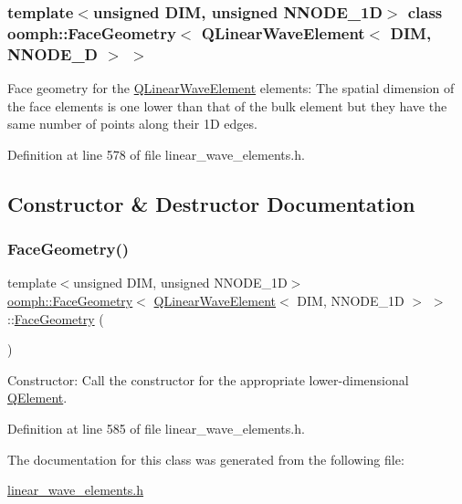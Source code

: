 \subsubsection*{template$<$unsigned D\+IM, unsigned N\+N\+O\+D\+E\+\_\+1D$>$\newline
class oomph\+::\+Face\+Geometry$<$ Q\+Linear\+Wave\+Element$<$ D\+I\+M, N\+N\+O\+D\+E\+\_\+D $>$ $>$}

Face geometry for the \hyperlink{classoomph_1_1QLinearWaveElement}{Q\+Linear\+Wave\+Element} elements\+: The spatial dimension of the face elements is one lower than that of the bulk element but they have the same number of points along their 1D edges. 

Definition at line 578 of file linear\+\_\+wave\+\_\+elements.\+h.



\subsection{Constructor \& Destructor Documentation}
\mbox{\label{classoomph_1_1FaceGeometry_3_01QLinearWaveElement_3_01DIM_00_01NNODE__1D_01_4_01_4_ae598de898fd7867e0456ca763cdfecd1}} 
\subsubsection{\texorpdfstring{Face\+Geometry()}{FaceGeometry()}}
{\footnotesize\ttfamily template$<$unsigned D\+IM, unsigned N\+N\+O\+D\+E\+\_\+1D$>$ \\
\hyperlink{classoomph_1_1FaceGeometry}{oomph\+::\+Face\+Geometry}$<$ \hyperlink{classoomph_1_1QLinearWaveElement}{Q\+Linear\+Wave\+Element}$<$ D\+IM, N\+N\+O\+D\+E\+\_\+1D $>$ $>$\+::\hyperlink{classoomph_1_1FaceGeometry}{Face\+Geometry} (\begin{DoxyParamCaption}{ }\end{DoxyParamCaption})\hspace{0.3cm}{\ttfamily [inline]}}



Constructor\+: Call the constructor for the appropriate lower-\/dimensional \hyperlink{classoomph_1_1QElement}{Q\+Element}. 



Definition at line 585 of file linear\+\_\+wave\+\_\+elements.\+h.



The documentation for this class was generated from the following file\+:\begin{DoxyCompactItemize}
\item 
\hyperlink{linear__wave__elements_8h}{linear\+\_\+wave\+\_\+elements.\+h}\end{DoxyCompactItemize}
